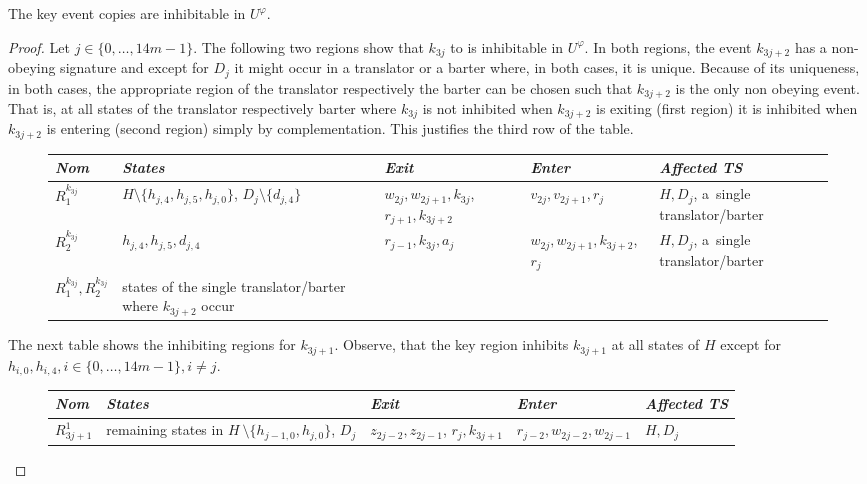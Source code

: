 \documentclass[english]{lipics_hacked}
\begin{document}
\begin{lemma}
\label{lemma:keycopies}
The key event copies are inhibitable in $U^\varphi$.
\end{lemma}
%
\begin{proof}
Let $j\in \{0,\dots,14m-1\}$.
The following two regions show that $k_{3j}$ to is inhibitable in $U^\varphi$.
In both regions, the event $k_{3j+2}$ has a non-obeying signature and except for $D_j$ it might occur in a translator or a barter where, in both cases, it is unique.
Because of its uniqueness, in both cases, the appropriate region of the translator respectively the barter can be chosen such that $k_{3j+2}$ is the only non obeying event. 
That is, at all states of the translator respectively barter where $k_{3j}$ is not inhibited when $k_{3j+2}$ is exiting (first region) it is inhibited when $k_{3j+2}$ is entering (second region) simply by complementation. 
This justifies the third row of the table.
%
\begin{figure}[H]
\centering
\begin{tabular}{p{1.2cm} p{3.2cm}   p{2.5cm}    p{2.5cm}      p{2.7cm}  }
\textit{Nom} &\textit{States} & \textit{Exit} & \textit{Enter} & \textit{Affected TS}  \\ \hline
$R^{k_{3j}}_1$  & $H\setminus \{h_{j,4},h_{j,5},h_{j,0}\}$, $D_j\setminus \{d_{j,4}\}$ & $w_{2j},w_{2j+1},k_{3j}$, $r_{j+1}, k_{3j+2}$ & $v_{2j},v_{2j+1},r_{j}$ & $H,D_j$, a~single translator/barter \\
 $R^{k_{3j}}_2$ & $h_{j,4},h_{j,5},d_{j,4}$&  $r_{j-1},k_{3j},a_j$& $w_{2j},w_{2j+1},k_{3j+2}$, $r_j$ & $H,D_j$, a~single translator/barter \\	
 $R^{k_{3j}}_1, R^{k_{3j}}_2$ & states of the single translator/barter where $k_{3j+2}$ occur &  & &\\							
\end{tabular}
\end{figure}
%
The next table shows the inhibiting regions for $k_{3j+1}$.
Observe, that the key region inhibits $k_{3j+1}$ at all states of $H$ except for $h_{i,0},h_{i,4}, i\in \{0,\dots,14m-1\},i\not=j$.
\begin{figure}[H]
\centering
\begin{tabular}{p{1cm} p{3.5cm}   p{2.5cm}    p{2.5cm}      p{2.7cm}  }
\textit{Nom} &\textit{States} & \textit{Exit} & \textit{Enter} & \textit{Affected TS}  \\ \hline
$R_{3j+1}^1$&  remaining states in $H~\setminus\{h_{j-1,0},h_{j,0}\}$, $D_j$ &$z_{2j-2},z_{2j-1}$, $r_j,k_{3j+1}$ &  $r_{j-2},w_{2j-2},w_{2j-1}$  & $H,D_{j}$ \\

\end{tabular}
\end{figure}
\end{proof}
\end{document}
